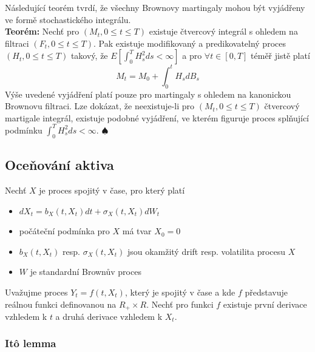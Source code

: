 \documentclass[a4paper]{book}
\begin{document}
Následující teorém tvrdí, že všechny Brownovy martingaly mohou být vyjádřeny ve formě stochastického integrálu.\\

\noindent \textbf{Teorém:} Nechť pro $(M_t, 0 \le t \le T)$ existuje čtvercový integrál s ohledem na filtraci $(F_t, 0 \le t \le T)$. Pak existuje modifikovaný a predikovatelný proces $(H_t, 0 \le t \le T)$ takový, že $E[\int_0^T H_s^2 ds < \infty]$  a pro $\forall t \in [0,T]$ téměř jistě platí
\begin{equation*}
M_t = M_0 + \int_0^t H_s d B_s
\end{equation*}
Výše uvedené vyjádření platí pouze pro martingaly s ohledem na kanonickou Brownovu filtraci. Lze dokázat, že neexistuje-li pro $(M_t, 0 \le t \le T)$ čtvercový martigale integrál, existuje podobné vyjádření, ve kterém figuruje proces splňující podmínku $\int_0^T H_s^2 ds < \infty$. $\spadesuit$

\subsection{Oceňování aktiva}

Nechť $X$ je proces spojitý v čase, pro který platí
\begin{itemize}
\item $d X_t = b_X(t, X_t)dt + \sigma_X(t, X_t)d W_t$
\item počáteční podmínka pro $X$ má tvar $X_0 = 0$
\item $b_X(t,X_t)$ resp. $\sigma_X(t, X_t)$ jsou okamžitý drift resp. volatilita procesu $X$
\item $W$ je standardní Brownův proces
\end{itemize}
Uvažujme proces $Y_t = f(t,X_t)$, který je spojitý v čase a kde $f$ představuje reálnou funkci definovanou na $R_{+} \times R$. Nechť pro funkci $f$ existuje první derivace vzhledem k $t$ a druhá derivace vzhledem k $X_t$.

\subsubsection{It\^o lemma}
\end{document}
